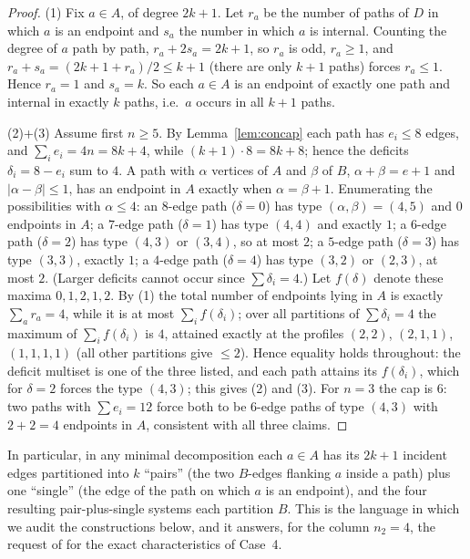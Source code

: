 \begin{proof}
(1) Fix $a\in A$, of degree $2k+1$. Let $r_a$ be the number of paths of $D$
in which $a$ is an endpoint and $s_a$ the number in which $a$ is internal.
Counting the degree of $a$ path by path, $r_a+2s_a=2k+1$, so $r_a$ is odd,
$r_a\ge1$, and $r_a+s_a=(2k+1+r_a)/2\le k+1$ (there are only $k+1$ paths)
forces $r_a\le1$. Hence $r_a=1$ and $s_a=k$. So each $a\in A$ is an
endpoint of exactly one path and internal in exactly $k$ paths, i.e.\ $a$
occurs in all $k+1$ paths.

(2)+(3) Assume first $n\ge5$. By Lemma~\ref{lem:concap} each path has
$e_i\le8$ edges, and $\sum_ie_i=4n=8k+4$, while $(k+1)\cdot8=8k+8$; hence
the deficits $\delta_i=8-e_i$ sum to $4$. A path with $\alpha$ vertices of
$A$ and $\beta$ of $B$, $\alpha+\beta=e+1$ and $|\alpha-\beta|\le1$, has an
endpoint in $A$ exactly when $\alpha=\beta+1$. Enumerating the
possibilities with $\alpha\le4$: an $8$-edge path ($\delta=0$) has type
$(\alpha,\beta)=(4,5)$ and $0$ endpoints in $A$; a $7$-edge path
($\delta=1$) has type $(4,4)$ and exactly $1$; a $6$-edge path
($\delta=2$) has type $(4,3)$ or $(3,4)$, so at most $2$; a $5$-edge path
($\delta=3$) has type $(3,3)$, exactly $1$; a $4$-edge path ($\delta=4$)
has type $(3,2)$ or $(2,3)$, at most $2$. (Larger deficits cannot occur
since $\sum\delta_i=4$.) Let $f(\delta)$ denote these maxima $0,1,2,1,2$.
By (1) the total number of endpoints lying in $A$ is exactly
$\sum_{a}r_a=4$, while it is at most $\sum_if(\delta_i)$; over all
partitions of $\sum\delta_i=4$ the maximum of $\sum_if(\delta_i)$ is $4$,
attained exactly at the profiles $(2,2)$, $(2,1,1)$, $(1,1,1,1)$ (all other
partitions give $\le2$). Hence equality holds throughout: the deficit
multiset is one of the three listed, and each path attains its
$f(\delta_i)$, which for $\delta=2$ forces the type $(4,3)$; this gives
(2) and (3). For $n=3$ the cap is $6$: two paths with $\sum e_i=12$ force
both to be $6$-edge paths of type $(4,3)$ with $2+2=4$ endpoints in $A$,
consistent with all three claims.
\end{proof}

In particular, in any minimal decomposition each $a\in A$ has its $2k+1$
incident edges partitioned into $k$ ``pairs'' (the two $B$-edges flanking
$a$ inside a path) plus one ``single'' (the edge of the path on which $a$
is an endpoint), and the four resulting pair-plus-single systems each
partition $B$. This is the language in which we audit the constructions
below, and it answers, for the column $n_2=4$, the request of \cite{CE18}
for the exact characteristics of Case~4.

